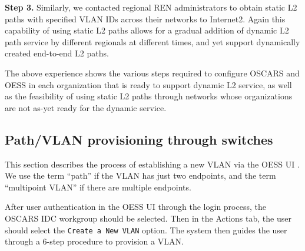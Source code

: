\textbf{Step 3.} Similarly, we contacted regional REN administrators to obtain static L2 paths with specified VLAN IDs
across their networks to Internet2. Again this capability of using static L2 paths allows for a gradual addition of
dynamic L2 path service by different regionals at different
times, and yet support dynamically created end-to-end L2
paths.

The above experience shows the various steps required to
configure OSCARS and OESS in each organization that is
ready to support dynamic L2 service, as well as the feasibility of using static L2 paths through networks whose organizations are not as-yet ready for the dynamic service.

\subsection{Path/VLAN provisioning through switches}
\label{sec:multidomain-SDN-path-provisioning}

This section describes the process of establishing a new VLAN via the OESS UI \cite{OESS}. We use the term ``path'' if the VLAN has just two
endpoints, and the term ``multipoint VLAN'' if there are multiple endpoints.

After user authentication in the OESS UI through the login process, the OSCARS IDC workgroup should
be selected. Then in the Actions tab, the user should select the \texttt{Create a New VLAN} option. The system then guides the user through a 6-step procedure to provision a VLAN.

